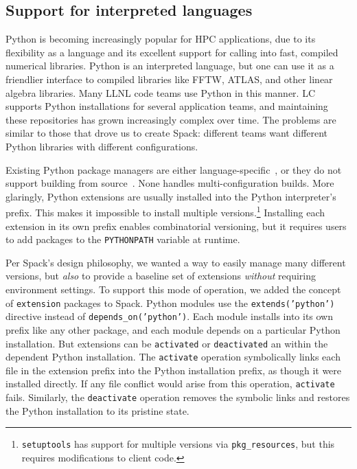 
\subsection{Support for interpreted languages}
\label{sec:usecase-python}

Python is becoming increasingly popular for HPC applications,
due to its flexibility as a language and its excellent support
for calling into fast, compiled numerical libraries.
Python is an interpreted language, but one can use it
as a friendlier interface to compiled libraries like FFTW, ATLAS, and
other linear algebra libraries.  Many LLNL code teams use Python in this manner.
%
LC supports Python installations for several application teams,
and maintaining these repositories has grown increasingly complex over
time. The problems are similar to those that drove us to create
Spack: different teams want different Python libraries with different
configurations.

Existing Python package managers are either language-specific~\cite{eby:setuptools},
or they do not support building from source~\cite{anaconda,conda}. None
handles multi-configuration builds.  More glaringly, Python extensions
are usually installed into the Python interpreter's prefix.
This makes it impossible to install multiple versions.\footnote{{\tt setuptools}
has support for multiple versions via {\tt pkg_resources},
but this requires modifications to client code.}
Installing each extension in its own prefix enables combinatorial versioning,
but it requires users to add packages to the {\tt PYTHONPATH} variable at runtime.

Per Spack's design philosophy, we wanted a way to easily manage many different
versions, but {\it also} to provide a baseline set of extensions {\it without}
requiring environment settings.
%
To support this mode of operation, we added the concept of {\tt extension} packages
to Spack. Python modules use the {\tt extends('python')} directive instead of
{\tt depends\_on('python')}.
Each module installs into its own prefix like any other package,
and each module depends on a particular Python installation.
But extensions can be {\tt activated} or {\tt deactivated} an
within the dependent Python installation.  The {\tt activate} operation
symbolically links each file in the extension prefix into the Python
installation prefix, as though it were installed directly. If any file
conflict would arise from this operation, {\tt activate} fails.
Similarly, the {\tt deactivate} operation removes the symbolic links and restores
the Python installation to its  pristine state.

